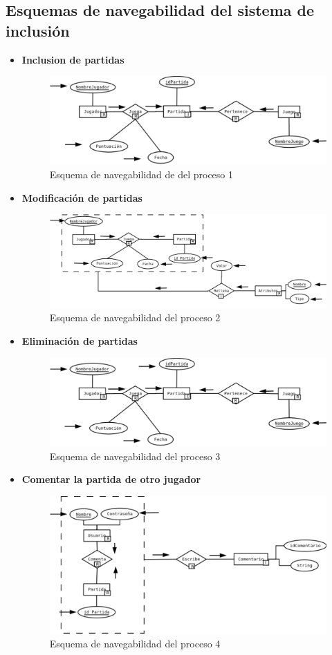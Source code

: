 \subsection{Esquemas de navegabilidad del sistema de inclusión}
\begin{itemize}
  \item \textbf{Inclusion de partidas}
  \begin{figure}[H]
    \centering
    \includegraphics[width=0.5\linewidth]{../Diagramas/pdf/IncluirPartida.pdf}
    \caption{Esquema de navegabilidad de del proceso 1}
  \end{figure}

  \item \textbf{Modificación de partidas}
  \begin{figure}[H]
    \centering
    \includegraphics[width=0.5\linewidth]{../Diagramas/pdf/ModificarPartida.pdf}
    \caption{Esquema de navegabilidad del proceso 2}
  \end{figure}

  \item \textbf{Eliminación de partidas}
  \begin{figure}[H]
    \centering
    \includegraphics[width=0.5\linewidth]{../Diagramas/pdf/EliminarRegistro.pdf}
    \caption{Esquema de navegabilidad del proceso 3}
  \end{figure}

  \item \textbf{Comentar la partida de otro jugador}
  \begin{figure}[H]
    \centering
    \includegraphics[width=0.5\linewidth]{../Diagramas/pdf/ComentarPartida.pdf}
    \caption{Esquema de navegabilidad del proceso 4}
  \end{figure}


\end{itemize}
